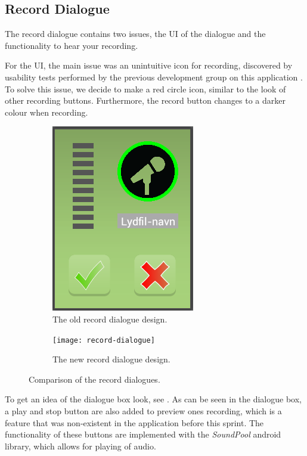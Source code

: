 \subsection{Record Dialogue}
The record dialogue contains two issues, the UI of the dialogue and the functionality to hear your recording.

For the UI, the main issue was an unintuitive icon for recording, discovered by usability tests performed by the previous development group on this application \citep{misc:crocold}. 
To solve this issue, we decide to make a red circle icon, similar to the look of other recording buttons. 
Furthermore, the record button changes to a darker colour when recording. 

\begin{figure}[h]
	\centering
	\begin{subfigure}[b]{0.45\textwidth}
		\centering
		\includegraphics[scale = 0.1]{media/CrocOldAudio}
		\caption{The old record dialogue design.}
		\label{figure:old-record-dialogue}
	\end{subfigure}
	\qquad
	\begin{subfigure}[b]{0.45\textwidth}
	     \centering
	     \texttt{[image: record-dialogue]}
	     \caption{The new record dialogue design.}
	     \label{fig:new-record-dialogue}
	\end{subfigure}
	\caption{Comparison of the record dialogues.}
	\label{figure:record-dialogue}
\end{figure}

To get an idea of the dialogue box look, see .
As can be seen in the dialogue box, a play and stop button are also added to preview ones recording, which is a feature that was non-existent in the application before this sprint.
The functionality of these buttons are implemented with the \textit{SoundPool} android library, which allows for playing of audio.

